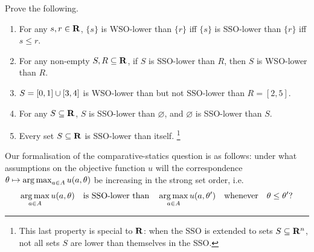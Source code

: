 \begin{exercise}
	\label{exercise:sso_wso}
	Prove the following.
	\begin{enumerate}[label=(\alph*)]

		\item For any $s,r \in \mathbf{R}$, $\{s\}$ is WSO-lower than $\{r\}$ iff $\{s\}$ is SSO-lower than $\{r\}$ iff $s \leq r$.
	
		\item \label{item:wso_sso_impl} For any non-empty $S,R \subseteq \mathbf{R}$, if $S$ is SSO-lower than $R$, then $S$ is WSO-lower than $R$.

		\item \label{item:sso_wso_nonequiv} $S = [0,1] \cup [3,4]$ is WSO-lower than but not SSO-lower than $R = [2,5]$.

		\item \label{item:sso_wso:empty} For any $S \subseteq \mathbf{R}$, $S$ is SSO-lower than $\varnothing$, and $\varnothing$ is SSO-lower than $S$.

		\item Every set $S \subseteq \mathbf{R}$ is SSO-lower than itself.%
			\footnote{This last property is special to $\mathbf{R}$: when the SSO is extended to sets $S \subseteq \mathbf{R}^n$, not all sets $S$ are lower than themselves in the SSO.}
	
	\end{enumerate}
\end{exercise}

Our formalisation of the comparative-statics question is as follows: under what assumptions on the objective function $u$ will the correspondence $\theta \mapsto \operatorname*{arg\,max}_{a \in A} u(a,\theta)$ be increasing in the strong set order, i.e.
%
\begin{equation*}
	\operatorname*{arg\,max}_{a \in A} u(a,\theta)
	\quad \text{is SSO-lower than} \quad
	\operatorname*{arg\,max}_{a \in A} u(a,\theta')
	\quad \text{whenever} \quad
	\theta \leq \theta' ?
\end{equation*}

